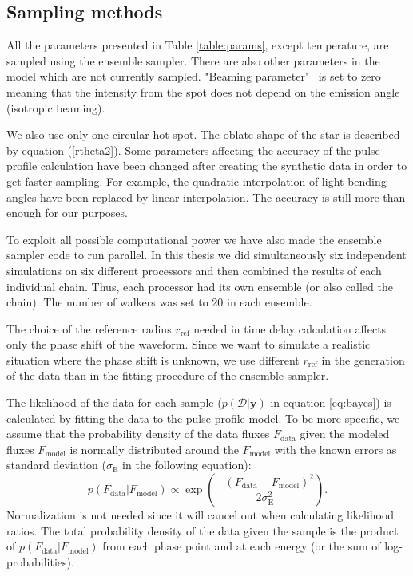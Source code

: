 \documentclass{wihuri}
\def\be{\begin{equation}}
\def\ee{\end{equation}}
\begin{document}
\subsection{Sampling methods}

All the parameters presented in Table \ref{table:params}, except temperature, are sampled using the ensemble sampler. There are also other parameters in the model which are not currently sampled. %
"Beaming parameter" \ is set to zero meaning that the intensity from the spot does not depend on the emission angle (isotropic beaming). 

We also use only one circular hot spot. The oblate shape of the star is described by
equation (\ref{rtheta2}). Some parameters affecting the accuracy of the pulse profile calculation have been changed after creating the synthetic data in order to get faster sampling. For example, the quadratic interpolation of light bending angles have been replaced by linear interpolation. The accuracy is still more than enough for our purposes. 

To exploit all possible computational power we have also made the ensemble sampler code to run parallel. In this thesis we did simultaneously six independent simulations on six different processors and then combined the results of each individual chain. Thus, each processor had its own ensemble (or also called the chain). The number of walkers was set to $20$ in each ensemble. 
 
The choice of the reference radius $r_{\mathrm{ref}}$ needed in time delay calculation affects only the phase shift of the waveform. Since we want to simulate a realistic situation where the phase shift is unknown, we use different $r_{\mathrm{ref}}$ in the generation of the data than in the fitting procedure of the ensemble sampler.  

The likelihood of the data for each sample ($p(\mathcal{D}|\textbf{y})$ in equation \ref{eq:bayes}) is calculated by fitting the data to the pulse profile model. To be more specific, we assume that the probability density of the data fluxes $F_{\mathrm{data}}$ given the modeled fluxes $F_{\mathrm{model}}$  is normally distributed around the $F_{\mathrm{model}}$ with the known errors as standard deviation ($\sigma_{\mathrm{E}}$ in the following equation): 
\be \label{eq:gaussprob}
p(F_{\mathrm{data}}|F_{\mathrm{model}}) \propto \exp \left (\frac{-(F_{\mathrm{data}}-F_{\mathrm{model}})^{2}}{2\sigma_{\mathrm{E}}^{2}} \right ).
\ee
Normalization is not needed since it will cancel out when calculating likelihood ratios. The total probability density of the data given the sample is the product of $p(F_{\mathrm{data}}|F_{\mathrm{model}})$ from each phase point and at each energy (or the sum of log-probabilities). 
\end{document}
